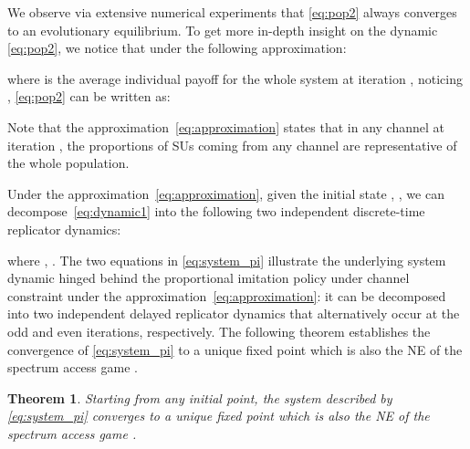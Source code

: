 \documentclass[12pt, onecolumn]{IEEEtran}
\theoremstyle{plain}
\newtheorem{theorem}{Theorem}
\theoremstyle{definition}
\begin{document}
\begin{comment}

\begin{figure*}
\begin{minipage}[r]{0.49\linewidth}
\texttt{[image: approximation.eps]}
\caption{System dynamic and its approximation by double replicator dynamic.}
\label{fig:approximation}
\end{minipage} \hfill
\begin{minipage}[c]{0.49\linewidth}
\texttt{[image: oursVSreplicators.eps]}
\caption{System dynamic with channel constraint and replicator dynamic without channel constraint}
\label{fig:oursVSreplicators}
\end{minipage}\hfill
\vspace{0.5cm}
\end{figure*}

\end{comment}


We observe via extensive numerical experiments that \eqref{eq:pop2} always converges to an evolutionary equilibrium. To get more in-depth insight on the dynamic \eqref{eq:pop2}, we notice that under the following approximation:

where  is the average individual payoff for the whole system at iteration , noticing , \eqref{eq:pop2} can be written as:

Note that the approximation~\eqref{eq:approximation} states that in any channel  at iteration , the proportions of SUs coming from any channel  are representative of the whole population.

Under the approximation~\eqref{eq:approximation}, given the initial state , , we can decompose~\eqref{eq:dynamic1} into the following two independent discrete-time replicator dynamics:

where , . The two equations in \eqref{eq:system_pi} illustrate the underlying system dynamic hinged behind the proportional imitation policy under channel constraint under the approximation~\eqref{eq:approximation}: it can be decomposed into two independent delayed replicator dynamics that alternatively occur at the odd and even iterations, respectively. The following theorem establishes the convergence of \eqref{eq:system_pi} to a unique fixed point which is also the NE of the spectrum access game .

\begin{theorem}
Starting from any initial point, the system described by \eqref{eq:system_pi} converges to a unique fixed point which is also the NE of the spectrum access game .
\label{th:convergence_pi_2}
\end{theorem}
\end{document}
